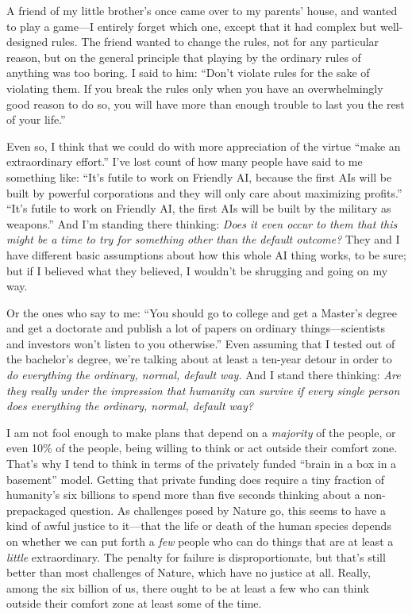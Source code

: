 {
 A friend of my little brother's once came over to
my parents' house, and wanted to play a game---I
entirely forget which one, except that it had complex but well-designed
rules. The friend wanted to change the rules, not for any particular
reason, but on the general principle that playing by the ordinary rules
of anything was too boring. I said to him:
``Don't violate rules for the sake of
violating them. If you break the rules only when you have an
overwhelmingly good reason to do so, you will have more than enough
trouble to last you the rest of your life.''}

{
 Even so, I think that we could do with more appreciation of the
virtue ``make an extraordinary
effort.'' I've lost count of how many
people have said to me something like:
``It's futile to work on Friendly AI,
because the first AIs will be built by powerful corporations and they
will only care about maximizing profits.''
``It's futile to work on Friendly AI,
the first AIs will be built by the military as
weapons.'' And I'm standing there
thinking: \textit{Does it even occur to them that this might be a time
to try for something other than the default outcome?} They and I have
different basic assumptions about how this whole AI thing works, to be
sure; but if I believed what they believed, I wouldn't
be shrugging and going on my way.}

{
 Or the ones who say to me: ``You should go to
college and get a Master's degree and get a doctorate
and publish a lot of papers on ordinary things---scientists and
investors won't listen to you
otherwise.'' Even assuming that I tested out of the
bachelor's degree, we're talking about
at least a ten-year detour in order to \textit{do everything the
ordinary, normal, default way.} And I stand there thinking: \textit{Are
they really under the impression that humanity can survive if every
single person does everything the ordinary, normal, default way?}}

{
 I am not fool enough to make plans that depend on a
\textit{majority} of the people, or even 10\% of the people, being
willing to think or act outside their comfort zone.
That's why I tend to think in terms of the privately
funded ``brain in a box in a
basement'' model. Getting that private funding does
require a tiny fraction of humanity's six billions to
spend more than five seconds thinking about a non-prepackaged question.
As challenges posed by Nature go, this seems to have a kind of awful
justice to it---that the life or death of the human species depends on
whether we can put forth a \textit{few} people who can do things that
are at least a \textit{little} extraordinary. The penalty for failure
is disproportionate, but that's still better than most
challenges of Nature, which have no justice at all. Really, among the
six billion of us, there ought to be at least a few who can think
outside their comfort zone at least some of the time.}

